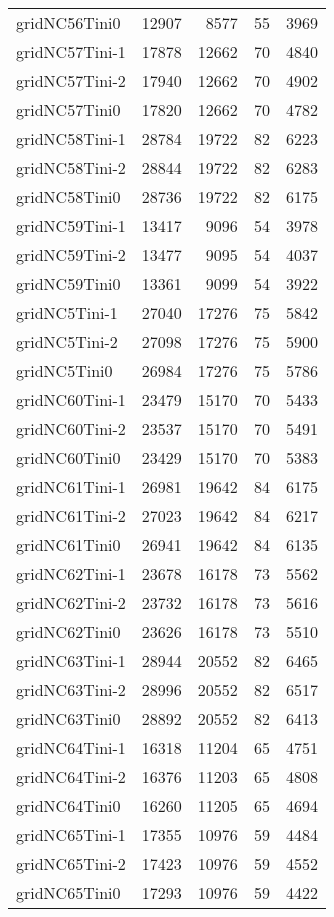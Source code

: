 \begin{tabular}{lrrrr}
gridNC56Tini0 & 12907 & 8577 & 55 & 3969 \\
gridNC57Tini-1 & 17878 & 12662 & 70 & 4840 \\
gridNC57Tini-2 & 17940 & 12662 & 70 & 4902 \\
gridNC57Tini0 & 17820 & 12662 & 70 & 4782 \\
gridNC58Tini-1 & 28784 & 19722 & 82 & 6223 \\
gridNC58Tini-2 & 28844 & 19722 & 82 & 6283 \\
gridNC58Tini0 & 28736 & 19722 & 82 & 6175 \\
gridNC59Tini-1 & 13417 & 9096 & 54 & 3978 \\
gridNC59Tini-2 & 13477 & 9095 & 54 & 4037 \\
gridNC59Tini0 & 13361 & 9099 & 54 & 3922 \\
gridNC5Tini-1 & 27040 & 17276 & 75 & 5842 \\
gridNC5Tini-2 & 27098 & 17276 & 75 & 5900 \\
gridNC5Tini0 & 26984 & 17276 & 75 & 5786 \\
gridNC60Tini-1 & 23479 & 15170 & 70 & 5433 \\
gridNC60Tini-2 & 23537 & 15170 & 70 & 5491 \\
gridNC60Tini0 & 23429 & 15170 & 70 & 5383 \\
gridNC61Tini-1 & 26981 & 19642 & 84 & 6175 \\
gridNC61Tini-2 & 27023 & 19642 & 84 & 6217 \\
gridNC61Tini0 & 26941 & 19642 & 84 & 6135 \\
gridNC62Tini-1 & 23678 & 16178 & 73 & 5562 \\
gridNC62Tini-2 & 23732 & 16178 & 73 & 5616 \\
gridNC62Tini0 & 23626 & 16178 & 73 & 5510 \\
gridNC63Tini-1 & 28944 & 20552 & 82 & 6465 \\
gridNC63Tini-2 & 28996 & 20552 & 82 & 6517 \\
gridNC63Tini0 & 28892 & 20552 & 82 & 6413 \\
gridNC64Tini-1 & 16318 & 11204 & 65 & 4751 \\
gridNC64Tini-2 & 16376 & 11203 & 65 & 4808 \\
gridNC64Tini0 & 16260 & 11205 & 65 & 4694 \\
gridNC65Tini-1 & 17355 & 10976 & 59 & 4484 \\
gridNC65Tini-2 & 17423 & 10976 & 59 & 4552 \\
gridNC65Tini0 & 17293 & 10976 & 59 & 4422 \\

\end{tabular}
